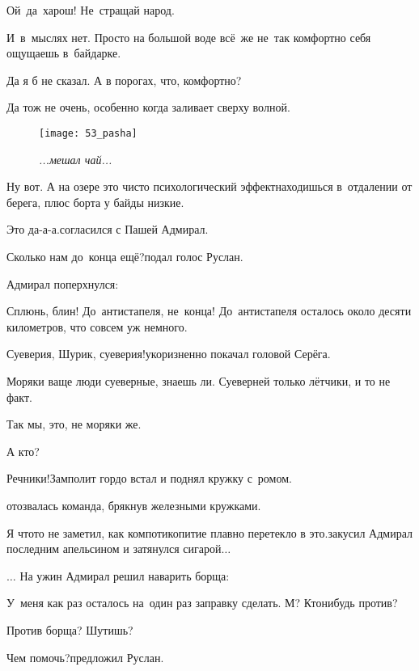 \diagdash Ой~да~харош! Не~стращай народ.

\diagdash И~в~мыслях нет. Просто на большой воде всё~же не~так комфортно себя ощущаешь в~байдарке.

\diagdash Да я б не сказал. А в порогах, что, комфортно?

\diagdash Да тож не очень, особенно когда заливает сверху волной.

\begin{wrapfigure}[17]{l}{0.50\textwidth}
	\centering
	\texttt{[image: 53\_pasha]}
	\caption{\small\textit{...мешал чай...}}
\end{wrapfigure}
\diagdash Ну вот. А на озере это чисто психологический эффект\mdash находишься в~отдалении от берега, плюс борта у байды низкие.

\diagdash Это да-а-а.\mdash согласился с Пашей Адмирал.

\diagdash Сколько нам до~конца ещё?\mdash подал голос Руслан.

Адмирал поперхнулся:

\diagdash Сплюнь, блин! До~антистапеля, не~конца! До~антистапеля осталось около десяти километров, что совсем уж немного.

\diagdash Суеверия, Шурик, суеверия!\mdash укоризненно покачал головой Серёга.

\diagdash Моряки ваще люди суеверные, знаешь ли. Суеверней только лётчики, и то не факт.

\diagdash Так мы, это, не моряки же.

\diagdash А кто?

\diagdash Речники!\mdash Замполит гордо встал и поднял кружку с~ромом.

\mdash отозвалась команда, брякнув железными кружками.

\diagdash Я что\sdash то не заметил, как компотикопитие плавно перетекло в это.\mdash закусил Адмирал последним апельсином и затянулся сигарой$\ldots$

$\ldots$ На ужин Адмирал решил наварить борща:

\diagdash У~меня как раз осталось на~один раз заправку сделать. М? Кто\sdash нибудь против?

\diagdash Против борща? Шутишь?

\diagdash Чем помочь?\mdash предложил Руслан.

